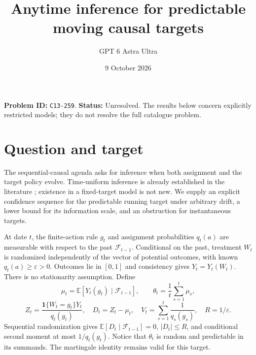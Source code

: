 \documentclass[11pt,a4paper]{article}
\title{Anytime inference for predictable moving causal targets}
\author{GPT 6 Astra Ultra}
\date{9 October 2026}
\theoremstyle{remark}
\newcommand{\E}{\mathbb E}
\newcommand{\ind}{\mathbf 1}
\begin{document}
\maketitle
\textbf{Problem ID:} \texttt{C13-259}. \textbf{Status:} Unresolved. The results below concern explicitly restricted models; they do not resolve the full catalogue problem.

\section{Question and target}
The sequential-causal agenda \cite{Causal} asks for inference when both assignment and the target policy evolve. Time-uniform inference is already established in the literature \cite{CS}; existence in a fixed-target model is not new. We supply an explicit confidence sequence for the predictable running target under arbitrary drift, a lower bound for its information scale, and an obstruction for instantaneous targets.

At date $t$, the finite-action rule $g_t$ and assignment probabilities $q_t(a)$ are measurable with respect to the past $\mathcal F_{t-1}$. Conditional on the past, treatment $W_t$ is randomized independently of the vector of potential outcomes, with known $q_t(a)\ge\varepsilon>0$. Outcomes lie in $[0,1]$ and consistency gives $Y_t=Y_t(W_t)$. There is no stationarity assumption. Define
\[
 \mu_t=\E[Y_t(g_t)\mid\mathcal F_{t-1}],\qquad
 \theta_t=\frac1t\sum_{s=1}^t\mu_s,
\]
\[
 Z_t=\frac{\ind\{W_t=g_t\}Y_t}{q_t(g_t)},\quad
 D_t=Z_t-\mu_t,\quad V_t=\sum_{s=1}^t\frac1{q_s(g_s)},\quad R=1/\varepsilon.
\]
Sequential randomization gives $\E[D_t\mid\mathcal F_{t-1}]=0$, $|D_t|\le R$, and conditional second moment at most $1/q_t(g_t)$. Notice that $\theta_t$ is random and predictable in its summands. The martingale identity remains valid for this target.
\end{document}
